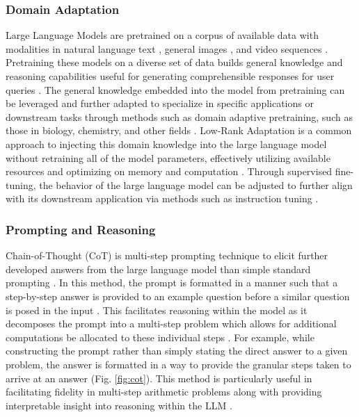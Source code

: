 \subsubsection{Domain Adaptation}
Large Language Models are pretrained on a corpus of available data with
modalities in natural language text \cite{brown_language_2020,
openai_gpt-oss-120b_2025}, general images \cite{alayrac_flamingo_2022,
li_blip_2022, radford_learning_2021}, and video sequences
\cite{alayrac_flamingo_2022, arnab_vivit_2021}. Pretraining these models on a
diverse set of data builds general knowledge and reasoning capabilities useful
for generating comprehensible responses for user queries
\cite{brown_language_2020}. The general knowledge embedded into the model from
pretraining can be leveraged and further adapted to specialize in specific
applications or downstream tasks through methods such as domain adaptive
pretraining, such as those in biology, chemistry, and other fields
\cite{gururangan_dont_2020, ock_catalyst_2023, lee_biobert_2020,
beltagy_scibert_2019}. Low-Rank Adaptation is a common approach to injecting
this domain knowledge into the large language model without retraining all of
the model parameters, effectively utilizing available resources and optimizing
on memory and computation \cite{hu_lora_2021}. Through supervised fine-tuning,
the behavior of the large language model can be adjusted to further align with
its downstream application via methods such as instruction tuning
\cite{wei_finetuned_2021, liu_visual_2023}.

\subsubsection{Prompting and Reasoning}
Chain-of-Thought (CoT) is multi-step prompting technique to elicit further
developed answers from the large language model than simple standard prompting
\cite{kojima_large_2023, wei_chain--thought_2023}. In this method, the prompt is
formatted in a manner such that a step-by-step answer is provided to an example
question before a similar question is posed in the input
\cite{kojima_large_2023, wei_chain--thought_2023}. This facilitates reasoning
within the model as it decomposes the prompt into a multi-step problem which
allows for additional computations be allocated to these individual steps
\cite{wei_chain--thought_2023}. For example, while constructing the prompt
rather than simply stating the direct answer to a given problem, the answer is
formatted in a way to provide the granular steps taken to arrive at an answer
\cite{wei_chain--thought_2023} (Fig. \ref{fig:cot}). This method is particularly
useful in facilitating fidelity in multi-step arithmetic problems along with
providing interpretable insight into reasoning within the LLM
\cite{wei_chain--thought_2023}.

